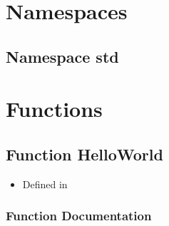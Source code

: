 \documentclass[letterpaper,10pt,english]{sphinxmanual}
\begin{document}
\section{Namespaces}
\label{\detokenize{api/library_root:namespaces}}
\sphinxstepscope


\subsection{Namespace std}
\label{\detokenize{api/namespace_std:namespace-std}}\label{\detokenize{api/namespace_std:id1}}\label{\detokenize{api/namespace_std::doc}}

\section{Functions}
\label{\detokenize{api/library_root:functions}}
\sphinxstepscope


\subsection{Function HelloWorld}
\label{\detokenize{api/function_HelloWorld_8h_1ae16d29305d03dd6abced14ecd0293bd8:function-helloworld}}\label{\detokenize{api/function_HelloWorld_8h_1ae16d29305d03dd6abced14ecd0293bd8:exhale-function-helloworld-8h-1ae16d29305d03dd6abced14ecd0293bd8}}\label{\detokenize{api/function_HelloWorld_8h_1ae16d29305d03dd6abced14ecd0293bd8::doc}}\begin{itemize}
\item {} 
\sphinxAtStartPar
Defined in 

\end{itemize}


\subsubsection{Function Documentation}
\label{\detokenize{api/function_HelloWorld_8h_1ae16d29305d03dd6abced14ecd0293bd8:function-documentation}}

\begin{fulllineitems}
\label{\detokenize{api/function_HelloWorld_8h_1ae16d29305d03dd6abced14ecd0293bd8:_CPPv410HelloWorldv}}
\pysigstartsignatures
\pysigstartmultiline
{}
\pysigstopmultiline
\pysigstopsignatures
\end{fulllineitems}
\end{document}
